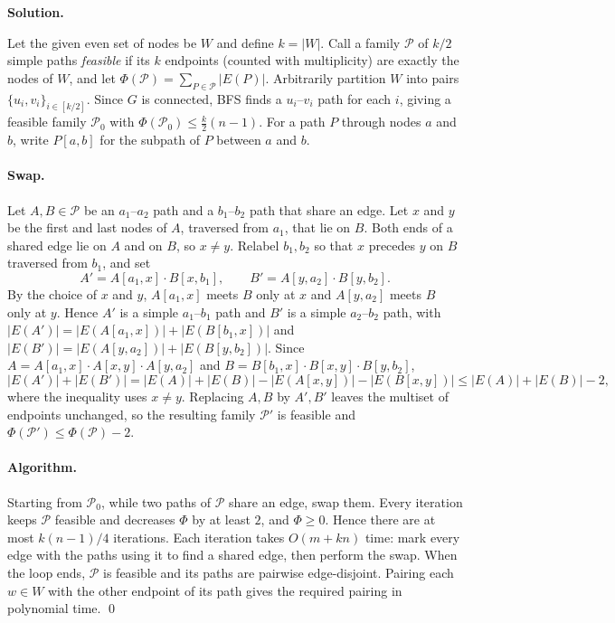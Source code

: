 \documentclass[11pt,letterpaper]{article}
\theoremstyle{definition}
\newcommand{\calP}{\mathcal{P}}
\newcommand{\solution}{\medskip\noindent\textbf{Solution.}\par\medskip}
\begin{document}
\solution
Let the given even set of nodes be $W$ and define $k = |W|$.
Call a family $\calP$ of $k/2$ simple paths \emph{feasible} if its $k$ endpoints (counted with multiplicity) are exactly the nodes of $W$, and let $\Phi(\calP) = \sum_{P \in \calP} |E(P)|$.
Arbitrarily partition $W$ into pairs $\{u_i,v_i\}_{i\in[k/2]}$.
Since $G$ is connected, BFS finds a $u_i$--$v_i$ path for each $i$, giving a feasible family $\calP_0$ with $\Phi(\calP_0) \leq \frac{k}{2}(n-1)$.
For a path $P$ through nodes $a$ and $b$, write $P[a,b]$ for the subpath of $P$ between $a$ and $b$.

\paragraph{Swap.}
Let $A, B \in \calP$ be an $a_1$--$a_2$ path and a $b_1$--$b_2$ path that share an edge.
Let $x$ and $y$ be the first and last nodes of $A$, traversed from $a_1$, that lie on $B$.
Both ends of a shared edge lie on $A$ and on $B$, so $x \neq y$.
Relabel $b_1, b_2$ so that $x$ precedes $y$ on $B$ traversed from $b_1$, and set
\[
    A' = A[a_1,x] \cdot B[x,b_1], \qquad B' = A[y,a_2] \cdot B[y,b_2].
\]
By the choice of $x$ and $y$, $A[a_1,x]$ meets $B$ only at $x$ and $A[y,a_2]$ meets $B$ only at $y$.
Hence $A'$ is a simple $a_1$--$b_1$ path and $B'$ is a simple $a_2$--$b_2$ path, with $|E(A')| = |E(A[a_1,x])| + |E(B[b_1,x])|$ and $|E(B')| = |E(A[y,a_2])| + |E(B[y,b_2])|$.
Since $A = A[a_1,x] \cdot A[x,y] \cdot A[y,a_2]$ and $B = B[b_1,x] \cdot B[x,y] \cdot B[y,b_2]$,
\[
    |E(A')| + |E(B')| = |E(A)| + |E(B)| - |E(A[x,y])| - |E(B[x,y])| \leq |E(A)| + |E(B)| - 2,
\]
where the inequality uses $x \neq y$.
Replacing $A, B$ by $A', B'$ leaves the multiset of endpoints unchanged, so the resulting family $\calP'$ is feasible and $\Phi(\calP') \leq \Phi(\calP) - 2$.

\paragraph{Algorithm.}
Starting from $\calP_0$, while two paths of $\calP$ share an edge, swap them.
Every iteration keeps $\calP$ feasible and decreases $\Phi$ by at least $2$, and $\Phi \geq 0$.
Hence there are at most $k(n-1)/4$ iterations.
Each iteration takes $O(m + kn)$ time: mark every edge with the paths using it to find a shared edge, then perform the swap.
When the loop ends, $\calP$ is feasible and its paths are pairwise edge-disjoint.
Pairing each $w \in W$ with the other endpoint of its path gives the required pairing in polynomial time.
\qed
\end{document}
